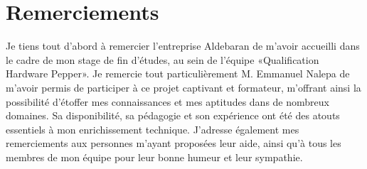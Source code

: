 \chapter*{Remerciements}

Je tiens tout d'abord à remercier l'entreprise Aldebaran de m'avoir accueilli dans le cadre de mon stage de fin d'études, au sein de l'équipe «Qualification Hardware Pepper».
\newline 
Je remercie tout particulièrement M. Emmanuel Nalepa de m'avoir permis de participer à ce projet captivant et formateur, m’offrant ainsi la possibilité d'étoffer mes connaissances et mes aptitudes dans de nombreux domaines. Sa disponibilité, sa pédagogie et son expérience ont été des atouts essentiels à mon enrichissement technique.
\newline
J’adresse également mes remerciements aux personnes m'ayant proposées leur aide, ainsi qu'à tous les membres de mon équipe pour leur bonne humeur et leur sympathie.